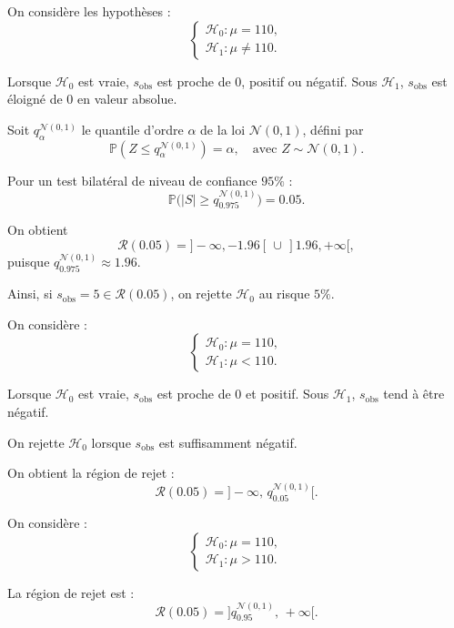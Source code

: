 \begin{exemple}
On considère les hypothèses :
\[
\begin{cases}
\mathcal{H}_0 : \mu = 110, \\
\mathcal{H}_1 : \mu \neq 110.
\end{cases}
\]

Lorsque $\mathcal{H}_0$ est vraie, $s_{\text{obs}}$ est proche de 0, positif ou négatif.  
Sous $\mathcal{H}_1$, $s_{\text{obs}}$ est éloigné de 0 en valeur absolue.  

Soit $q_\alpha^{\mathcal{N}(0,1)}$ le quantile d’ordre $\alpha$ de la loi $\mathcal{N}(0,1)$, défini par
\[
\mathbb{P}(Z \leq q_\alpha^{\mathcal{N}(0,1)}) = \alpha, 
\quad \text{avec } Z \sim \mathcal{N}(0,1).
\]

Pour un test bilatéral de niveau de confiance $95\%$ :
\[
\mathbb{P}\big(|S| \geq q_{0.975}^{\mathcal{N}(0,1)}\big) = 0.05.
\]

On obtient
\[
\mathcal{R}(0.05) = ]-\infty, -1.96[ \,\cup\, ]1.96, +\infty[,
\]
puisque $q_{0.975}^{\mathcal{N}(0,1)} \approx 1.96$.

Ainsi, si $s_{\text{obs}} = 5 \in \mathcal{R}(0.05)$, on rejette $\mathcal{H}_0$ au risque $5\%$.
\end{exemple}

\begin{exemple}
On considère :
\[
\begin{cases}
\mathcal{H}_0 : \mu = 110, \\
\mathcal{H}_1 : \mu < 110.
\end{cases}
\]

Lorsque $\mathcal{H}_0$ est vraie, $s_{\text{obs}}$ est proche de 0 et positif.  
Sous $\mathcal{H}_1$, $s_{\text{obs}}$ tend à être négatif.  

On rejette $\mathcal{H}_0$ lorsque $s_{\text{obs}}$ est suffisamment négatif.  

On obtient la région de rejet :
\[
\mathcal{R}(0.05) = ]-\infty, \, q_{0.05}^{\mathcal{N}(0,1)}[.
\]
\end{exemple}

\begin{exemple}
On considère :
\[
\begin{cases}
\mathcal{H}_0 : \mu = 110, \\
\mathcal{H}_1 : \mu > 110.
\end{cases}
\]

La région de rejet est :
\[
\mathcal{R}(0.05) = ]q_{0.95}^{\mathcal{N}(0,1)}, \, +\infty[.
\]
\end{exemple}

